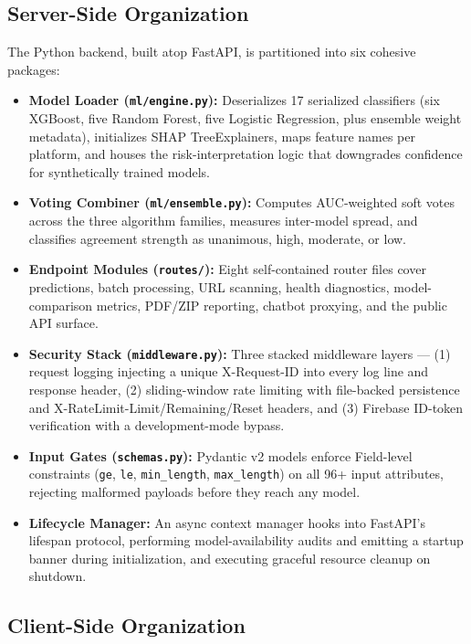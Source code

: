 \documentclass[conference]{IEEEtran}
\begin{document}
\subsection{Server-Side Organization}

The Python backend, built atop FastAPI, is partitioned into six cohesive packages:

\begin{itemize}
    \item \textbf{Model Loader (\texttt{ml/engine.py}):} Deserializes 17 serialized classifiers (six XGBoost, five Random Forest, five Logistic Regression, plus ensemble weight metadata), initializes SHAP TreeExplainers, maps feature names per platform, and houses the risk-interpretation logic that downgrades confidence for synthetically trained models.
    \item \textbf{Voting Combiner (\texttt{ml/ensemble.py}):} Computes AUC-weighted soft votes across the three algorithm families, measures inter-model spread, and classifies agreement strength as unanimous, high, moderate, or low.
    \item \textbf{Endpoint Modules (\texttt{routes/}):} Eight self-contained router files cover predictions, batch processing, URL scanning, health diagnostics, model-comparison metrics, PDF/ZIP reporting, chatbot proxying, and the public API surface.
    \item \textbf{Security Stack (\texttt{middleware.py}):} Three stacked middleware layers --- (1) request logging injecting a unique X-Request-ID into every log line and response header, (2) sliding-window rate limiting with file-backed persistence and X-RateLimit-Limit/Remaining/Reset headers, and (3) Firebase ID-token verification with a development-mode bypass.
    \item \textbf{Input Gates (\texttt{schemas.py}):} Pydantic v2 models enforce Field-level constraints (\texttt{ge}, \texttt{le}, \texttt{min\_length}, \texttt{max\_length}) on all 96+ input attributes, rejecting malformed payloads before they reach any model.
    \item \textbf{Lifecycle Manager:} An async context manager hooks into FastAPI's lifespan protocol, performing model-availability audits and emitting a startup banner during initialization, and executing graceful resource cleanup on shutdown.
\end{itemize}

\subsection{Client-Side Organization}
\end{document}
